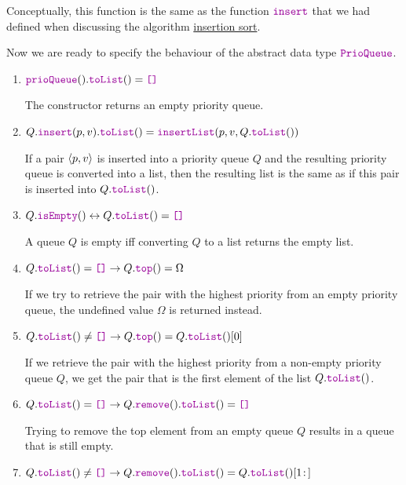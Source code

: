 \begin{Definition}
\begin{enumerate}
\begin{enumerate}
\begin{enumerate}
            \end{enumerate}
            Conceptually, this function is the same as the function $\mytt{insert}$ that we had defined when
            discussing the algorithm \hyperref[sec:insertionSort]{insertion sort}.
      \end{enumerate}
      Now we are ready to specify the behaviour of the abstract data type $\mytt{PrioQueue}$.
      \begin{enumerate}
      \item $\mytt{prioQueue}().\mytt{toList}() = \mytt{[]}$

            The constructor returns an empty priority queue.
      \item $Q.\mytt{insert}(p,v).\mytt{toList}() = \mytt{insertList}(p,v,Q.\mytt{toList}())$

            If a pair $\pair(p,v)$ is inserted into a priority queue $Q$ and the resulting priority queue is
            converted into a list, then the resulting list is the same as if this pair is inserted
            into $Q.\mytt{toList}()$.
      \item $Q.\mytt{isEmpty}() \leftrightarrow Q.\mytt{toList}() = \mytt{[]}$

            A queue $Q$ is empty iff converting $Q$ to a list returns the empty list.
      \item $Q.\mytt{toList}() = \mytt{[]} \rightarrow Q.\mytt{top}() = \Omega$

            If we try to retrieve the pair with the highest priority from an empty priority queue, the
            undefined value $\Omega$ is returned instead.
      \item $Q.\mytt{toList}() \not= \mytt{[]} \rightarrow Q.\mytt{top}() = Q.\mytt{toList}()[0]$

            If we retrieve the  pair with the highest priority from a non-empty priority queue $Q$,
            we get the pair that is the first element of the list $Q.\mytt{toList}()$.

      \item $Q.\mytt{toList}() = \mytt{[]} \rightarrow Q.\mytt{remove}().\mytt{toList}() = \mytt{[]}$

            Trying to remove the top element from an empty queue $Q$ results in a queue that is still empty.
      \item $Q.\mytt{toList}() \not= \mytt{[]} \rightarrow Q.\mytt{remove}().\mytt{toList}() =
        Q.\mytt{toList}()[1\!:\,]$


\end{enumerate}
\end{enumerate}
\end{Definition}
